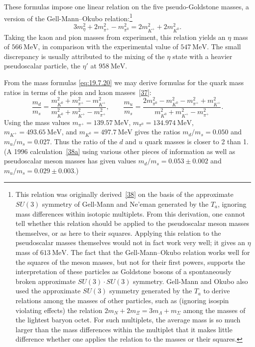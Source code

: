 These formulas impose one linear relation on the five pseudo-Goldstone masses, a version of the Gell-Mann--Okubo relation:\footnote{This relation was originally derived~\hyperref[ch19-ref-38]{[38]} on the basis of the approximate $SU(3)$ symmetry of Gell-Mann and Ne'eman generated by the $T_a$, ignoring mass differences within isotopic multiplets. From this derivation, one cannot tell whether this relation should be applied to the pseudoscalar meson masses themselves, or as here to their squares. Applying this relation to the pseudoscalar masses themselves would not in fact work very well; it gives an $\eta$ mass of $613\ \mathrm{MeV}$. The fact that the Gell-Mann--Okubo relation works well for the squares of the meson masses, but not for their first powers, supports the interpretation of these particles as Goldstone bosons of a spontaneously broken approximate $SU(3)\cdot SU(3)$ symmetry. Gell-Mann and Okubo also used the approximate $SU(3)$ symmetry generated by the $T_a$ to derive relations among the masses of other particles, such as (ignoring isospin violating effects) the relation $2m_N+2m_\Xi=3m_\Lambda+m_\Sigma$ among the masses of the lightest baryon octet. For such multiplets, the average mass is so much larger than the mass differences within the multiplet that it makes little difference whether one applies the relation to the masses or their squares.}
\begin{equation}
3m_\eta^2+2m_{\pi^+}^2-m_{\pi^0}^2
=2m_{K^+}^2+2m_{K^0}^2.
\tag{19.7.21}\label{eq:19.7.21}
\end{equation}
Taking the kaon and pion masses from experiment, this relation yields an $\eta$ mass of $566\ \mathrm{MeV}$, in comparison with the experimental value of $547\ \mathrm{MeV}$. The small discrepancy is usually attributed to the mixing of the $\eta$ state with a heavier pseudoscalar particle, the $\eta'$ at $958\ \mathrm{MeV}$.

From the mass formulas \eqref{eq:19.7.20} we may derive formulas for the quark mass ratios in terms of the pion and kaon masses~\hyperref[ch19-ref-37]{[37]}:
\begin{equation}
\frac{m_d}{m_s}
=\frac{m_{K^0}^2+m_{\pi^+}^2-m_{K^+}^2}
{m_{K^0}^2+m_{K^+}^2-m_{\pi^+}^2},
\qquad
\frac{m_u}{m_s}
=\frac{2m_{\pi^0}^2-m_{K^0}^2-m_{\pi^+}^2+m_{K^+}^2}
{m_{K^0}^2+m_{K^+}^2-m_{\pi^+}^2}.
\tag{19.7.22}\label{eq:19.7.22}
\end{equation}
Using the mass values $m_{\pi^+}=139.57\ \mathrm{MeV}$, $m_{\pi^0}=134.974\ \mathrm{MeV}$, $m_{K^+}=493.65\ \mathrm{MeV}$, and $m_{K^0}=497.7\ \mathrm{MeV}$ gives the ratios $m_d/m_s=0.050$ and $m_u/m_s=0.027$. Thus the ratio of the $d$ and $u$ quark masses is closer to 2 than 1. (A 1996 calculation~\hyperref[ch19-ref-38a]{[38a]} using various other pieces of information as well as pseudoscalar meson masses has given values $m_d/m_s=0.053\pm0.002$ and $m_u/m_s=0.029\pm0.003$.)


